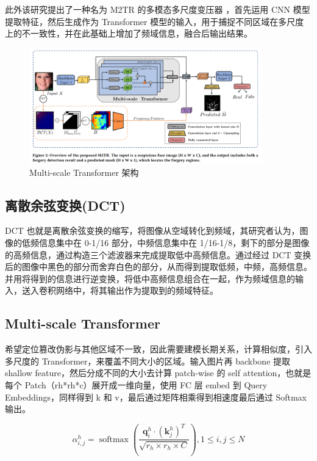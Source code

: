 此外该研究提出了一种名为 M2TR 的多模态多尺度变压器 ，首先运用 CNN 模型提取特征，然后生成作为 Transformer 模型的输入，用于捕捉不同区域在多尺度上的不一致性，并在此基础上增加了频域信息，融合后输出结果。

\begin{figure}[htb]
\centering 
\includegraphics[width=0.90\textwidth]{img/ch4m12.png} 
\caption{Multi-scale Transformer 架构}
\label{Test}
\end{figure}

\subsection{离散余弦变换(DCT)}

DCT 也就是离散余弦变换的缩写，将图像从空域转化到频域，其研究者认为，图像的低频信息集中在 0-1/16 部分，中频信息集中在 1/16-1/8，剩下的部分是图像的高频信息，通过构造三个滤波器来完成提取低中高频信息。通过经过 DCT 变换后的图像中黑色的部分而舍弃白色的部分，从而得到提取低频，中频，高频信息。并用将得到的信息进行逆变换，将低中高频信息组合在一起，作为频域信息的输入，送入卷积网络中，将其输出作为提取到的频域特征。

\subsection{Multi-scale Transformer}

希望定位篡改伪影与其他区域不一致，因此需要建模长期关系，计算相似度，引入多尺度的 Transformer，来覆盖不同大小的区域。输入图片再 backbone 提取 shallow feature，然后分成不同的大小去计算 patch-wise 的 self attention，也就是每个 Patch（rh*rh*c）展开成一维向量，使用 FC 层 embed 到 Query Embeddings，同样得到 k 和 v，最后通过矩阵相乘得到相速度最后通过 Softmax 输出。

$$
\alpha_{i, j}^{h}=\operatorname{softmax}\left(\frac{\boldsymbol{q}_{i}^{h} \cdot\left(\boldsymbol{k}_{j}^{h}\right)^{T}}{\sqrt{r_{h} \times r_{h} \times C}}\right), 1 \leq i, j \leq N
$$

